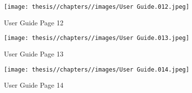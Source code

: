 \begin{figure} [H]
    \centering
    \texttt{[image: thesis//chapters//images/User Guide.012.jpeg]}
    \caption{User Guide Page 12}
 
\end{figure}

\begin{figure} [H]
    \centering
    \texttt{[image: thesis//chapters//images/User Guide.013.jpeg]}
    \caption{User Guide Page 13}
 
\end{figure}

\begin{figure} [H]
    \centering
    \texttt{[image: thesis//chapters//images/User Guide.014.jpeg]}
    \caption{User Guide Page 14}
 
\end{figure}


